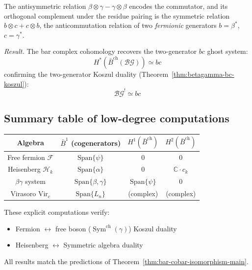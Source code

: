 The antisymmetric relation $\beta \otimes \gamma - \gamma \otimes \beta$ encodes the commutator, and
its orthogonal complement under the residue pairing is the symmetric relation $b \otimes c + c \otimes b$,
the anticommutation relation of two \emph{fermionic} generators $b = \beta^*$, $c = \gamma^*$.

\emph{Result.} The bar complex cohomology recovers the two-generator $bc$ ghost system:
\[H^*(\bar{B}^{\text{ch}}(\mathcal{BG})) \simeq bc\]
confirming the two-generator Koszul duality (Theorem~\ref{thm:betagamma-bc-koszul}):
\[\mathcal{BG}^! \simeq bc\]

\subsection{Summary table of low-degree computations}

\begin{center}
\begin{tabular}{c|c|c|c}
\textbf{Algebra} & $\bar{B}^1$ (cogenerators) & $H^1(\bar{B}^{\mathrm{ch}})$ & $H^2(\bar{B}^{\mathrm{ch}})$ \\ \hline
Free fermion $\mathcal{F}$ & $\text{Span}\{\psi\}$ & 0 & 0 \\
Heisenberg $\mathcal{H}_k$ & $\text{Span}\{\alpha\}$ & 0 & $\mathbb{C} \cdot c_k$ \\
$\beta\gamma$ system & $\text{Span}\{\beta,\gamma\}$ & $\text{Span}\{\psi\}$ & 0 \\
Virasoro $\text{Vir}_c$ & $\text{Span}\{L_n\}$ & (complex) & (complex)
\end{tabular}
\end{center}

These explicit computations verify:
\begin{itemize}
\item Fermion $\leftrightarrow$ free boson ($\operatorname{Sym}^{\mathrm{ch}}(\gamma)$) Koszul duality
\item Heisenberg $\leftrightarrow$ Symmetric algebra duality
\end{itemize}

All results match the predictions of Theorem~\ref{thm:bar-cobar-isomorphism-main}.
